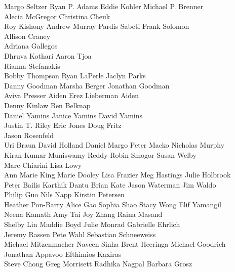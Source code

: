 \begin{spacing}{2}
\begin{center}
Margo Seltzer \quad Ryan P. Adams \quad Eddie Kohler \quad Michael P. Brenner \\
Alecia McGregor \quad Christina Cheuk \\
Roy Kishony \quad Andrew Murray \quad Pardis Sabeti \quad Frank Solomon \\
Allison Craney \\
Adriana Gallegos \\
Dhruva Kothari \quad Aaron Tjoa \\
Rianna Stefanakis \\
Bobby Thompson \quad Ryan LaPerle \quad Jaclyn Parks \\
Danny Goodman \quad Marsha Berger \quad Jonathan Goodman \\
Aviva Presser Aiden \quad Erez Lieberman Aiden \\
Denny Kinlaw \quad Ben Belknap \\
Daniel Yamins \quad Janice Yamins \quad David Yamins \\
Justin T. Riley \quad Eric Jones \quad Doug Fritz \\
Jason Rosenfeld \\
Uri Braun \quad David Holland \quad Daniel Margo \quad Peter Macko \quad Nicholas Murphy \\
Kiran-Kumar Muniswamy-Reddy \quad Robin Smogor \quad Susan Welby \\
Marc Chiarini \quad Lisa Lowy \\
Ann Marie King \quad Marie Dooley \quad Lisa Frazier \quad Meg Hastings \quad Julie Holbrook \\
Peter Bailis \quad Karthik Dantu \quad Brian Kate \quad Jason Waterman \quad Jim Waldo \\
Philip Guo \quad Nils Napp \quad Kirstin Petersen \\
Heather Pon-Barry \quad Alice Gao \quad Sophia Shao \quad \quad Stacy Wong \quad Elif Yamangil \\
Neena Kamath \quad Amy Tai \quad Joy Zhang \quad Raina Masand \\
Shelby Lin \quad Maddie Boyd \quad Julie Monrad \quad Gabrielle Ehrlich \\ 
Jeremy Rassen \quad Pete Wahl \quad Sebastian Schneeweiss \\
Michael Mitzenmacher \quad Naveen Sinha \quad Brent Heeringa \quad  Michael Goodrich \\
Jonathan Appavoo \quad Efthimios Kaxiras \\
Steve Chong \quad Greg Morrisett \quad Radhika Nagpal \quad Barbara Grosz \\

\end{center}
\end{spacing}
